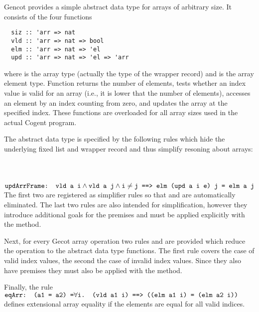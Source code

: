 Gencot provides a simple abstract data type for arrays of arbitrary size. It consists of the four functions
\begin{verbatim}
  siz :: 'arr => nat
  vld :: 'arr => nat => bool
  elm :: 'arr => nat => 'el
  upd :: 'arr => nat => 'el => 'arr
\end{verbatim}
where  is the array type (actually the type of the wrapper record) and  is the array element type.
Function  returns the number of elements,  tests whether an index value is valid for an array (i.e.,
it is lower that the number of elements),  accesses an element by an index counting from zero, and 
updates the array at the specified index. These functions are overloaded for all array sizes used in the actual Cogent 
program.

The abstract data type is specified by the following rules which hide the underlying fixed list and wrapper record and
thus simplify resoning about arrays:\\[1ex]
  \hspace*{2ex}\\
  \hspace*{2ex}\\
  \hspace*{2ex}\\
  \hspace*{2ex}$\textnormal{\texttt{updArrFrame: vld a i}} \wedge \textnormal{\texttt{vld a j}} \wedge \textnormal{\texttt{i}} \neq \textnormal{\texttt{j ==> elm (upd a i e) j = elm a j}}$\\[1ex]
The first two are registered as simplifier rules so that  and  are automatically eliminated. The last
two rules are also intended for simplification, however they introduce additional goals for the premises and must be
applied explicitly with the  method.

Next, for every Gecot array operation  two rules  and  are provided which 
reduce the operation to the abstract data type functions. The first rule covers the case of valid index values, the second
the case of invalid index values. Since they also have premises they must also be applied with the  method.

Finally, the rule\\[1ex]
  \hspace*{2ex}$\textnormal{\texttt{eqArr: (a1 = a2) =}} \forall \textnormal{\texttt{i. (vld a1 i) ==> ((elm a1 i) = (elm a2 i))}}$\\[1ex]
defines extensional array equality if the elements are equal for all valid indices. 

